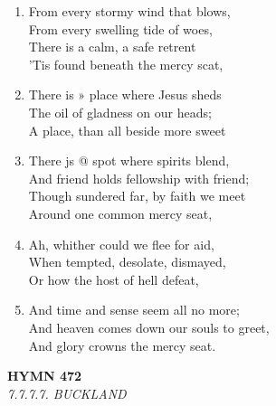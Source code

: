\documentclass[11pt,a4paper]{article}
\begin{document}
\begin{enumerate}
    \item From every stormy wind that blows, \\
        From every swelling tide of woes, \\
        There is a calm, a safe retrent \\
        'Tis found beneath the mercy scat,

    \item There is » place where Jesus sheds \\
        The oil of gladness on our heads; \\
        A place, than all beside more sweet

    \item There js @ spot where spirits blend, \\
        And friend holds fellowship with friend; \\
        Though sundered far, by faith we meet \\
        Around one common mercy seat,

    \item Ah, whither could we flee for aid, \\
        When tempted, desolate, dismayed, \\
        Or how the host of hell defeat,

    \item And time and sense seem all no more; \\
        And heaven comes down our souls to greet, \\
        And glory crowns the mercy seat.

\end{enumerate}

\newpage
\begin{center}
    {\Large \textbf{HYMN 472}}
    \\
    \textit{7.7.7.7. BUCKLAND}
\end{center}
\vspace{1em}
\end{document}
